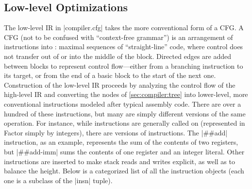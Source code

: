 \subsection{Low-level Optimizations}\label{sec:compiler:cfg}

The low-level \gls{IR} in \factor|compiler.cfg| takes the more conventional
form of a \gls{CFG}.  A \gls{CFG} (not to be confused with ``context-free
grammar'') is an arrangement of instructions into : maximal
sequences of ``straight-line'' code, where control does not transfer out of or
into the middle of the block.  Directed edges are added between blocks to
represent control flow---either from a branching instruction to its target, or
from the end of a basic block to the start of the next one.
Construction of the low-level \gls{IR} proceeds by analyzing the control flow
of the high-level \gls{IR} and converting the nodes of \cref{sec:compiler:tree}
into lower-level, more conventional instructions modeled after typical assembly
code.  There are over a hundred of these instructions, but many are simply
different versions of the same operation.  For instance, while instructions are
generally called on  (represented in Factor simply by
integers), there are  versions of instructions.  The
\factor|##add| instruction, as an example, represents the sum of the contents
of two registers, but \factor|##add-imm| sums the contents of one register and
an integer literal.  Other instructions are inserted to make stack reads and
writes explicit, as well as to balance the height.  Below is a categorized list
of all the instruction objects (each one is a subclass of the \factor|insn|
tuple).





